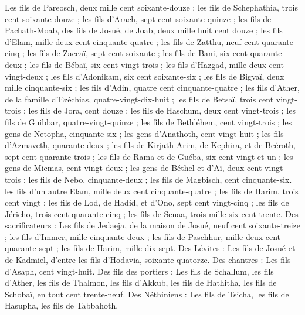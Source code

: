 \begin{multicols}{2}
Les fils de Pareosch, deux mille cent soixante-douze ;
les fils de Schephathia, trois cent soixante-douze ;
les fils d'Arach, sept cent soixante-quinze ;
les fils de Pachath-Moab, des fils de Josué, de Joab, deux mille huit cent douze ;
les fils d'Elam, mille deux cent cinquante-quatre ;
les fils de Zatthu, neuf cent quarante-cinq ;
les fils de Zaccaï, sept cent soixante ;
les fils de Bani, six cent quarante-deux ;
les fils de Bébaï, six cent vingt-trois ;
les fils d'Hazgad, mille deux cent vingt-deux ;
les fils d'Adonikam, six cent soixante-six ;
les fils de Bigvaï, deux mille cinquante-six ;
les fils d’Adin, quatre cent cinquante-quatre ;
les fils d'Ather, de la famille d'Ezéchias, quatre-vingt-dix-huit ;
les fils de Betsaï, trois cent vingt-trois ;
les fils de Jora, cent douze ;
les fils de Haschum, deux cent vingt-trois ;
les fils de Guibbar, quatre-vingt-quinze ;
les fils de Bethléhem, cent vingt-trois ;
les gens de Netopha, cinquante-six ;
les gens d'Anathoth, cent vingt-huit ;
les fils d'Azmaveth, quarante-deux ;
les fils de Kirjath-Arim, de Kephira, et de Beéroth, sept cent quarante-trois ;
les fils de Rama et de Guéba, six cent vingt et un ;
les gens de Micmas, cent vingt-deux ;
les gens de Béthel et d’Aï, deux cent vingt-trois ;
les fils de Nebo, cinquante-deux ;
les fils de Magbisch, cent cinquante-six.
les fils d'un autre Elam, mille deux cent cinquante-quatre ;
les fils de Harim, trois cent vingt ;
les fils de Lod, de Hadid, et d'Ono, sept cent vingt-cinq ;
les fils de Jéricho, trois cent quarante-cinq ;
les fils de Senaa, trois mille six cent trente.
Des sacrificateurs : Les fils de Jedaeja, de la maison de Josué, neuf cent soixante-treize ;
les fils d'Immer, mille cinquante-deux ;
les fils de Paschhur, mille deux cent quarante-sept ;
les fils de Harim, mille dix-sept.
Des Lévites : Les fils de Josué et de Kadmiel, d'entre les fils d’Hodavia, soixante-quatorze.
Des chantres : Les fils d'Asaph, cent vingt-huit.
Des fils des portiers : Les fils de Schallum, les fils d'Ather, les fils de Thalmon, les fils d’Akkub, les fils de Hathitha, les fils de Schobaï, en tout cent trente-neuf.
Des Néthiniens : Les fils de Tsicha, les fils de Hasupha, les fils de Tabbahoth,

\end{multicols}
